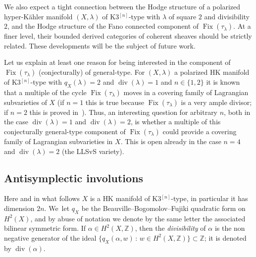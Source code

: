 \documentclass[11pt]{article}
\newcommand{\HK}{\textup{HK}\xspace}
\newcommand{\ZZ}{{\mathbb Z}}\let\Z\ZZ
\DeclareMathOperator{\divisore}{div}\let\div\divisore
\DeclareMathOperator{\Fix}{Fix}
\theoremstyle{definition}
\begin{document}
We also expect a tight connection between the Hodge structure of a polarized hyper-Kähler manifold $(X,\lambda)$
of K3$^{[n]}$-type
with $\lambda$ of square $2$ and divisibility $2$, and the Hodge structure of the Fano connected component of
$\Fix(\tau_{\lambda})$. At a finer level, their bounded derived categories of coherent sheaves should be strictly related. These developments will be the subject of future work.

Let us explain at least one reason for being interested in the component of $\Fix(\tau_{\lambda})$ (conjecturally) of general-type. For $(X,\lambda)$ a polarized \HK manifold of K3$^{[n]}$-type with $q_X(\lambda)=2$ and $\divisore(\lambda)=1$ and $n\in\{1,2\}$ it is known that a multiple of the cycle $\Fix(\tau_{\lambda})$ moves in a covering family of Lagrangian subvarieties of $X$ (if $n=1$ this is true because $\Fix(\tau_{\lambda})$ is a very ample divisor; if $n=2$ this is proved in~\cite{Ferretti:thesis,Kieran:LagrangianCovering}). Thus,
an interesting question for arbitrary $n$, both in the case $\divisore(\lambda)=1$ and \hbox{$\divisore(\lambda)=2$}, is whether a multiple of this conjecturally general-type component of $\Fix(\tau_{\lambda})$ could provide a
covering family of Lagrangian subvarieties in $X$.
This is open already in the case $n=4$ and $\divisore(\lambda)=2$ (the LLSvS variety).

\subsection{Antisymplectic involutions}\label{subsec:AntisymplecticIntro}

Here and in what follows $X$ is a \HK manifold of K3$^{[n]}$-type, in particular it has dimension $2n$. We~let $q_X$ be the Beauville--Bogomolov--Fujiki quadratic form on $H^2(X)$, and by abuse of notation we denote by the same letter the associated bilinear symmetric form.
If $\alpha\in H^2(X,\ZZ)$, then the \emph{divisibility} of $\alpha$ is the non negative generator of the ideal $\{q_X(\alpha,w)\,:\,w\in H^2(X,\ZZ)\}\subset\ZZ$; it is denoted by $\divisore(\alpha)$.
\end{document}

